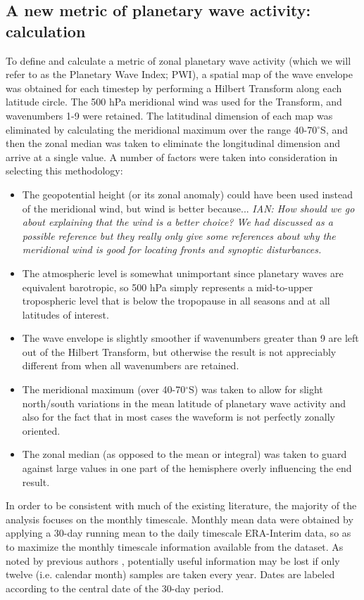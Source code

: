 \subsection{A new metric of planetary wave activity: calculation}

To define and calculate a metric of zonal planetary wave activity (which we will refer to as the Planetary Wave Index; PWI), a spatial map of the wave envelope was obtained for each timestep by performing a Hilbert Transform along each latitude circle. The 500 hPa meridional wind was used for the Transform, and wavenumbers 1-9 were retained. The latitudinal dimension of each map was eliminated by calculating the meridional maximum over the range 40-70$^{\circ}$S, and then the zonal median was taken to eliminate the longitudinal dimension and arrive at a single value. A number of factors were taken into consideration in selecting this methodology:
\begin{itemize}
\item The geopotential height (or its zonal anomaly) could have been used instead of the meridional wind, but wind is better because... \textit{IAN: How should we go about explaining that the wind is a better choice? We had discussed \citet{Hope2014} as a possible reference but they really only give some references about why the meridional wind is good for locating fronts and synoptic disturbances.}
\item The atmospheric level is somewhat unimportant since planetary waves are equivalent barotropic, so 500 hPa simply represents a mid-to-upper tropospheric level that is below the tropopause in all seasons and at all latitudes of interest.
\item The wave envelope is slightly smoother if wavenumbers greater than 9 are left out of the Hilbert Transform, but otherwise the result is not appreciably different from when all wavenumbers are retained.
\item The meridional maximum (over 40-70$^{\circ}$S) was taken to allow for slight north/south variations in the mean latitude of planetary wave activity and also for the fact that in most cases the waveform is not perfectly zonally oriented. 
\item The zonal median (as opposed to the mean or integral) was taken to guard against large values in one part of the hemisphere overly influencing the end result.
\end{itemize}

In order to be consistent with much of the existing literature, the majority of the analysis focuses on the monthly timescale. Monthly mean data were obtained by applying a 30-day running mean to the daily timescale ERA-Interim data, so as to maximize the monthly timescale information available from the dataset. As noted by previous authors \citep[e.g.][]{Kidson1988}, potentially useful information may be lost if only twelve (i.e. calendar month) samples are taken every year. Dates are labeled according to the central date of the 30-day period.   